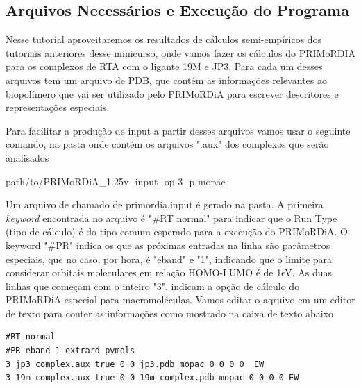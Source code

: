 \documentclass[a4paper,11pt]{refart}
\begin{document}
	\subsection{Arquivos Necessários e Execução do Programa}
	
	Nesse tutorial aproveitaremos os resultados de cálculos semi-empíricos dos tutoriais anteriores desse minicurso, onde vamos fazer os cálculos do PRIMoRDIA para os complexos de RTA com o ligante 19M e JP3. Para cada um desses arquivos tem um arquivo de PDB, que contém as informações relevantes ao biopolímero que vai ser utilizado pelo PRIMoRDiA para escrever descritores e representações especiais.
	
	Para facilitar a produção de input a partir desses arquivos vamos usar o seguinte comando, na pasta onde contém os arquivos ".aux" dos complexos que serão analisados
	
	\hspace*{-1.2\leftmarginwidth}
	\begin{minipage}{\fullwidth}
		\begin{commandshell}path/to/PRIMoRDiA_1.25v -input -op 3 -p mopac\end{commandshell}
	\end{minipage}
	
	
	Um arquivo de chamado de primordia.input é gerado na pasta. A primeira \textit{keyword} encontrada no arquivo é "\#RT normal" para indicar que o Run Type (tipo de cálculo) é do tipo comum esperado para a execução do PRIMoRDiA. O keyword "\#PR" indica os que as próximas entradas na linha são parâmetros especiais, que no caso, por hora, é "eband" e "1", indicando que o limite para considerar orbitais moleculares em relação HOMO-LUMO é de 1eV. As duas linhas que começam com o inteiro "3", indicam a opção de cálculo do PRIMoRDiA especial para macromoléculas. Vamos editar  o aqruivo em um editor de texto para conter as informações como mostrado na caixa de texto abaixo
	
	\hspace*{-1.5\leftmarginwidth}
	\begin{minipage}{\fullwidth}
		\begin{lstlisting}[caption={Input editado para execução do tutorial 3},label={tut301}]
#RT normal 
#PR eband 1 extrard pymols 
3 jp3_complex.aux true 0 0 jp3.pdb mopac 0 0 0 0  EW 
3 19m_complex.aux true 0 0 19m_complex.pdb mopac 0 0 0 0 EW	
		\end{lstlisting}
	\end{minipage}
	
\end{document}
